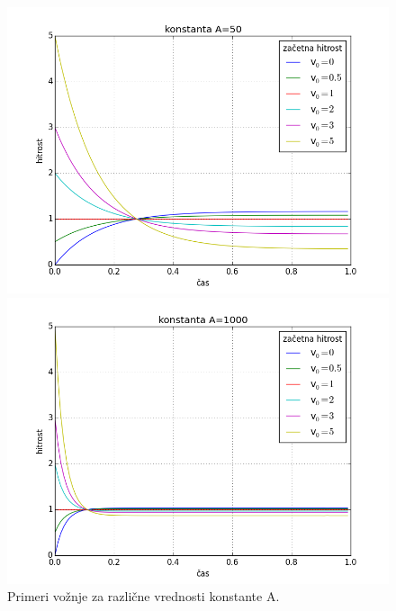 \documentclass[11pt]{article}
\numberwithin{equation}{section} %
\numberwithin{table}{section} %
\begin{document}
\begin{figure}[t]
{\begin{minipage}[t]{0.5\paperwidth}
\begin{flushleft}

\includegraphics[scale=0.5]{slike/konstanta50.png}
\hspace{\fill}
\end{flushleft}
\end{minipage}
\begin{minipage}[t]{0.5\paperwidth}
\includegraphics[scale=0.5]{slike/konstanta1000.png}
\end{minipage}%
}
\caption{Primeri vožnje za različne vrednosti konstante A.}
\end{figure}


\clearpage
\end{document}
